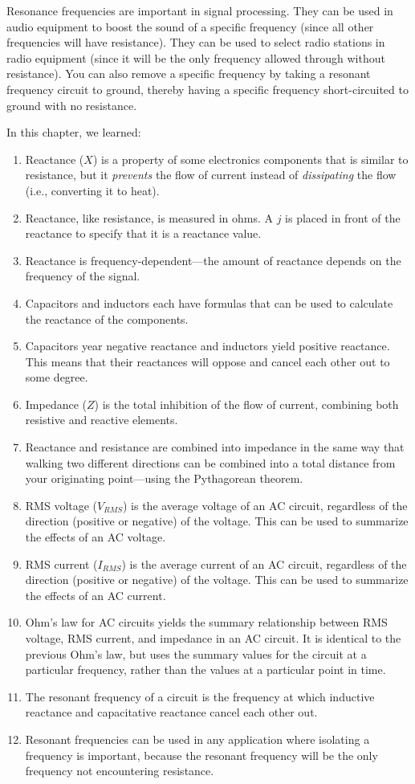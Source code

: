Resonance frequencies are important in signal processing.
They can be used in audio equipment to boost the sound of a specific frequency (since all other frequencies will have resistance).
They can be used to select radio stations in radio equipment (since it will be the only frequency allowed through without resistance).
You can also remove a specific frequency by taking a resonant frequency circuit to ground, thereby having a specific frequency short-circuited to ground with no resistance.

\reviewsection

In this chapter, we learned:

\begin{enumerate}
\item Reactance ($X$) is a property of some electronics components that is similar to resistance, but it \emph{prevents} the flow of current instead of \emph{dissipating} the flow (i.e., converting it to heat).
\item Reactance, like resistance, is measured in ohms.  A $j$ is placed in front of the reactance to specify that it is a reactance value.
\item Reactance is frequency-dependent---the amount of reactance depends on the frequency of the signal.
\item Capacitors and inductors each have formulas that can be used to calculate the reactance of the components.  
\item Capacitors year negative reactance and inductors yield positive reactance.  This means that their reactances will oppose and cancel each other out to some degree.
\item Impedance ($Z$) is the total inhibition of the flow of current, combining both resistive and reactive elements.
\item Reactance and resistance are combined into impedance in the same way that walking two different directions can be combined into a total distance from your originating point---using the Pythagorean theorem.
\item RMS voltage ($V_{RMS}$) is the average voltage of an AC circuit, regardless of the direction (positive or negative) of the voltage.  This can be used to summarize the effects of an AC voltage.
\item RMS current ($I_{RMS}$) is the average current of an AC circuit, regardless of the direction (positive or negative) of the voltage.  This can be used to summarize the effects of an AC current.
\item Ohm's law for AC circuits yields the summary relationship between RMS voltage, RMS current, and impedance in an AC circuit.  It is identical to the previous Ohm's law, but uses the summary values for the circuit at a particular frequency, rather than the values at a particular point in time.
\item The resonant frequency of a circuit is the frequency at which inductive reactance and capacitative reactance cancel each other out.
\item Resonant frequencies can be used in any application where isolating a frequency is important, because the resonant frequency will be the only frequency not encountering resistance.
\end{enumerate}

